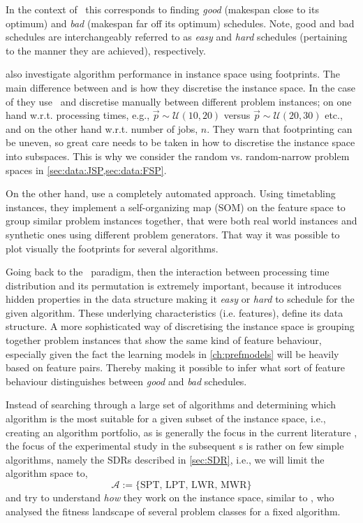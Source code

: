 In the context of \jsp\ this corresponds to finding \emph{good} (makespan close to its optimum)  and \emph{bad} (makespan far off its optimum) schedules. Note, good and bad schedules are interchangeably referred to as \emph{easy} and \emph{hard} schedules (pertaining to the manner they are achieved), respectively. 

\citet{SmithMilesLion5} also investigate algorithm performance in instance space using footprints. The main difference between \citeauthor{Corne10} and \citeauthor{SmithMilesLion5} is how they discretise the instance space. In the case of \citeauthor{Corne10} they use \jsp\ and discretise manually between different problem instances; on one hand w.r.t. processing times, e.g.,  $\vec{p}\sim \mathcal{U}(10,20)$ versus $\vec{p}\sim \mathcal{U}(20,30)$ etc., and on the other hand w.r.t. number of jobs, $n$. 
They warn that footprinting can be uneven, so great care needs to be taken in 
how to discretise the instance space into subspaces. 
This is why we consider the random vs. random-narrow problem spaces in 
\cref{sec:data:JSP,sec:data:FSP}.

On the other hand, \citeauthor{SmithMilesLion5} use a completely automated 
approach. Using timetabling instances, they implement a self-organizing map 
(SOM) on the feature space to group similar problem instances together, that 
were both real world instances and synthetic ones using different problem 
generators. That way it was possible to plot visually the footprints for 
several algorithms.

Going back to the \jsp\ paradigm, then the interaction between processing time 
distribution and its permutation is extremely important, because it introduces 
hidden properties in the data structure making it \emph{easy} or \emph{hard} to 
schedule for the given algorithm. These underlying characteristics (i.e. 
features), define its data structure. A more sophisticated way of discretising 
the instance space is grouping together problem instances that show the same 
kind of feature behaviour, especially given the fact the learning models in 
\cref{ch:prefmodels} will be heavily based on feature pairs. Thereby making it 
possible to infer what sort of feature behaviour distinguishes  between 
\emph{good} and \emph{bad} schedules. 

Instead of searching through a large set of algorithms  and determining which 
algorithm is the most suitable for a given subset of the instance space, i.e., 
creating an algorithm portfolio, as is generally the focus in the current 
literature \citep{SmithMilesLion3,SmithMilesLion5,Corne10}, the focus of the 
experimental study in the subsequent s
is rather on few simple algorithms, namely the SDRs described in 
\cref{sec:SDR}, i.e., we will limit the algorithm space to, 
\begin{equation}\label{eq:SDRset}
\mathcal{A}:=\{\text{SPT,~LPT,~LWR,~MWR}\}
\end{equation} 
and try to understand \emph{how} they work on the instance space, similar to 
\citet{Whitley}, who analysed the fitness landscape of several problem classes 
for a fixed algorithm. 

